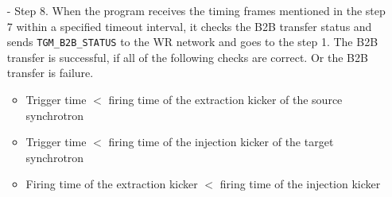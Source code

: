 \begin{itemize}
\begin{itemize}
		\item[-]Step 8. When the program receives the timing frames mentioned in the step 7 within a specified timeout interval, it checks the B2B transfer status and sends \verb|TGM_B2B_STATUS| to the WR network and goes to the step 1. The B2B transfer is successful, if all of the following checks are correct. Or the B2B transfer is failure. 
\begin{itemize}
	\item Trigger time $<$ firing time of the extraction kicker of the source synchrotron

	\item Trigger time $<$ firing time of the injection kicker of the target synchrotron

	\item Firing time of the extraction kicker $<$ firing time of the injection kicker
\end{itemize}
 


\end{itemize}
\end{itemize}
